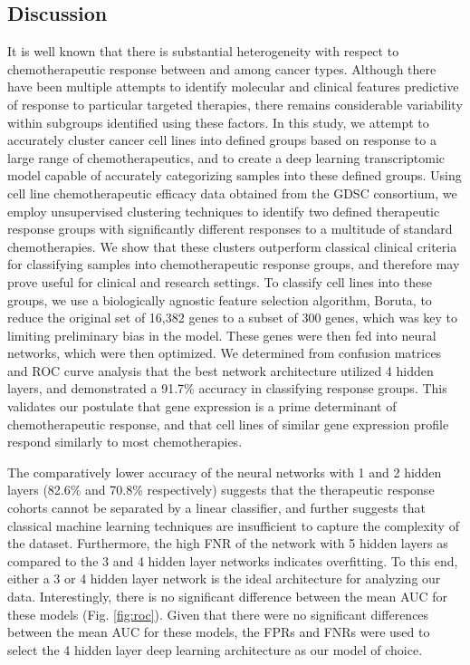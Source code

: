 \documentclass[10pt, letterpaper]{article}
\begin{document}
\begin{multicols*}{2}
\section{Discussion}
It is well known that there is substantial heterogeneity with respect to chemotherapeutic response between and among cancer types. Although there have been multiple attempts to identify molecular and clinical features predictive of response to particular targeted therapies, there remains considerable variability within subgroups identified using these factors. In this study, we attempt to accurately cluster cancer cell lines into defined groups based on response to a large range of chemotherapeutics, and to create a deep learning transcriptomic model capable of accurately categorizing samples into these defined groups. Using cell line chemotherapeutic efficacy data obtained from the GDSC consortium, we employ unsupervised clustering techniques to identify two defined therapeutic response groups with significantly different responses to a multitude of standard chemotherapies. We show that these clusters outperform classical clinical criteria for classifying samples into chemotherapeutic response groups, and therefore may prove useful for clinical and research settings. To classify cell lines into these groups, we use a biologically agnostic feature selection algorithm, Boruta, to reduce the original set of 16,382 genes to a subset of 300 genes, which was key to limiting preliminary bias in the model. These genes were then fed into neural networks, which were then optimized. We determined from confusion matrices and ROC curve analysis that the best network architecture utilized 4 hidden layers, and demonstrated a 91.7\% accuracy in classifying response groups. This validates our postulate that gene expression is a prime determinant of chemotherapeutic response, and that cell lines of similar gene expression profile respond similarly to most chemotherapies.

The comparatively lower accuracy of the neural networks with 1 and 2 hidden layers (82.6\% and 70.8\% respectively) suggests that the therapeutic response cohorts cannot be separated by a linear classifier, and further suggests that classical machine learning techniques are insufficient to capture the complexity of the dataset. Furthermore, the high FNR of the network with 5 hidden layers as compared to the 3 and 4 hidden layer networks indicates overfitting. To this end, either a 3 or 4 hidden layer network is the ideal architecture for analyzing our data. Interestingly, there is no significant difference between the mean AUC for these models (Fig. \ref{fig:roc}). Given that there were no significant differences between the mean AUC for these models, the FPRs and FNRs were used to select the 4 hidden layer deep learning architecture as our model of choice.


\end{multicols*}
\end{document}
